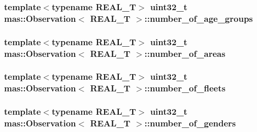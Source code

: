 \subsubsection[{number\+\_\+of\+\_\+age\+\_\+groups}]{\setlength{\rightskip}{0pt plus 5cm}template$<$typename R\+E\+A\+L\+\_\+\+T$>$ uint32\+\_\+t {\bf mas\+::\+Observation}$<$ R\+E\+A\+L\+\_\+\+T $>$\+::number\+\_\+of\+\_\+age\+\_\+groups}\label{classmas_1_1_observation_a56d2181956836fe2e3d7d39d17795929}
\hypertarget{classmas_1_1_observation_abe10a9fcce4305cdc7840b8d25b87c8e}{}
\subsubsection[{number\+\_\+of\+\_\+areas}]{\setlength{\rightskip}{0pt plus 5cm}template$<$typename R\+E\+A\+L\+\_\+\+T$>$ uint32\+\_\+t {\bf mas\+::\+Observation}$<$ R\+E\+A\+L\+\_\+\+T $>$\+::number\+\_\+of\+\_\+areas}\label{classmas_1_1_observation_abe10a9fcce4305cdc7840b8d25b87c8e}
\hypertarget{classmas_1_1_observation_a6843bf35d78a6405a41afc9e4a1334e6}{}
\subsubsection[{number\+\_\+of\+\_\+fleets}]{\setlength{\rightskip}{0pt plus 5cm}template$<$typename R\+E\+A\+L\+\_\+\+T$>$ uint32\+\_\+t {\bf mas\+::\+Observation}$<$ R\+E\+A\+L\+\_\+\+T $>$\+::number\+\_\+of\+\_\+fleets}\label{classmas_1_1_observation_a6843bf35d78a6405a41afc9e4a1334e6}
\hypertarget{classmas_1_1_observation_a481d3e475a2ff592156ea4b180f91876}{}
\subsubsection[{number\+\_\+of\+\_\+genders}]{\setlength{\rightskip}{0pt plus 5cm}template$<$typename R\+E\+A\+L\+\_\+\+T$>$ uint32\+\_\+t {\bf mas\+::\+Observation}$<$ R\+E\+A\+L\+\_\+\+T $>$\+::number\+\_\+of\+\_\+genders}\label{classmas_1_1_observation_a481d3e475a2ff592156ea4b180f91876}
\hypertarget{classmas_1_1_observation_a6e3ce52d5a415a29b901ba4c8007bbc5}{}
